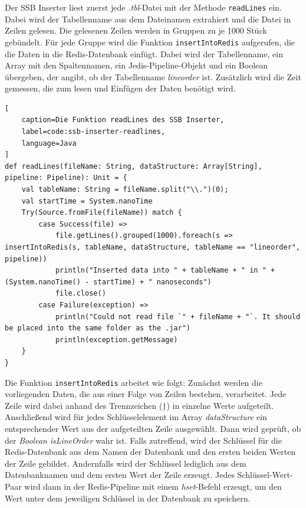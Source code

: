 Der SSB Inserter liest zuerst jede \emph{.tbl}-Datei mit der Methode \lstinline|readLines| ein. Dabei wird der Tabellenname aus dem Dateinamen extrahiert und die Datei in Zeilen gelesen. Die gelesenen Zeilen werden in Gruppen zu je 1000 Stück gebündelt. Für jede Gruppe wird die Funktion \lstinline|insertIntoRedis| aufgerufen, die die Daten in die Redis-Datenbank einfügt. Dabei wird der Tabellenname, ein Array mit den Spaltennamen, ein Jedis-Pipeline-Objekt und ein Boolean übergeben, der angibt, ob der Tabellenname \emph{lineorder} ist.
Zusätzlich wird die Zeit gemessen, die zum lesen und Einfügen der Daten benötigt wird.

\begin{lstlisting}[
    caption=Die Funktion readLines des SSB Inserter,
    label=code:ssb-inserter-readlines,
    language=Java
]
def readLines(fileName: String, dataStructure: Array[String], pipeline: Pipeline): Unit = {
	val tableName: String = fileName.split("\\.")(0);
	val startTime = System.nanoTime
	Try(Source.fromFile(fileName)) match {
		case Success(file) =>
			file.getLines().grouped(1000).foreach(s => insertIntoRedis(s, tableName, dataStructure, tableName == "lineorder", pipeline))
			println("Inserted data into " + tableName + " in " + (System.nanoTime() - startTime) + " nanoseconds")
			file.close()
		case Failure(exception) =>
			println("Could not read file `" + fileName + "`. It should be placed into the same folder as the .jar")
			println(exception.getMessage)
	}
}
\end{lstlisting}

Die Funktion \lstinline|insertIntoRedis| arbeitet wie folgt: Zunächst werden die vorliegenden Daten, die aus einer Folge von Zeilen bestehen, verarbeitet. Jede Zeile wird dabei anhand des Trennzeichen (\lstinline+|+) in einzelne Werte aufgeteilt. Anschließend wird für jedes Schlüsselelement im Array \emph{dataStructure} ein entsprechender Wert aus der aufgeteilten Zeile ausgewählt. Dann wird geprüft, ob der \emph{Boolean} \emph{isLineOrder} wahr ist. Falls zutreffend, wird der Schlüssel für die Redis-Datenbank aus dem Namen der Datenbank und den ersten beiden Werten der Zeile gebildet. Andernfalls wird der Schlüssel lediglich aus dem Datenbanknamen und dem ersten Wert der Zeile erzeugt. Jedes Schlüssel-Wert-Paar wird dann in der Redis-Pipeline mit einem \emph{hset}-Befehl erzeugt, um den Wert unter dem jeweiligen Schlüssel in der Datenbank zu speichern.

